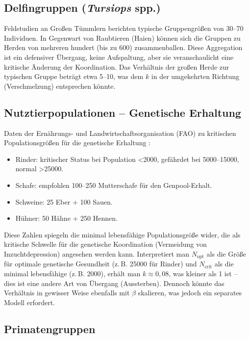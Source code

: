 \documentclass[12pt]{article}
\theoremstyle{remark}
\begin{document}
	\subsection{Delfingruppen (\textit{Tursiops} spp.)}
	\label{subsec:dolphins}
	
	Feldstudien an Großen Tümmlern \cite{Connor2000} berichten typische Gruppengrößen von 30–70 Individuen. In Gegenwart von Raubtieren (Haien) können sich die Gruppen zu Herden von mehreren hundert (bis zu 600) zusammenballen. Diese Aggregation ist ein defensiver Übergang, keine Aufspaltung, aber sie veranschaulicht eine kritische Änderung der Koordination. Das Verhältnis der großen Herde zur typischen Gruppe beträgt etwa 5–10, was dem $k$ in der umgekehrten Richtung (Verschmelzung) entsprechen könnte.
	
	\subsection{Nutztierpopulationen – Genetische Erhaltung}
	\label{subsec:livestock}
	
	Daten der Ernährungs- und Landwirtschaftsorganisation (FAO) zu kritischen Populationsgrößen für die genetische Erhaltung \cite{FAO2013}:
	\begin{itemize}
		\item Rinder: kritischer Status bei Population <2000, gefährdet bei 5000–15000, normal >25000.
		\item Schafe: empfohlen 100–250 Mutterschafe für den Genpool-Erhalt.
		\item Schweine: 25 Eber + 100 Sauen.
		\item Hühner: 50 Hähne + 250 Hennen.
	\end{itemize}
	Diese Zahlen spiegeln die minimal lebensfähige Populationsgröße wider, die als kritische Schwelle für die genetische Koordination (Vermeidung von Inzuchtdepression) angesehen werden kann. Interpretiert man $N_{\text{opt}}$ als die Größe für optimale genetische Gesundheit (z. B. 25000 für Rinder) und $N_{\text{crit}}$ als die minimal lebensfähige (z. B. 2000), erhält man $k \approx 0,08$, was kleiner als 1 ist – dies ist eine andere Art von Übergang (Aussterben). Dennoch könnte das Verhältnis in gewisser Weise ebenfalls mit $\beta$ skalieren, was jedoch ein separates Modell erfordert.
	
	\subsection{Primatengruppen}
	\label{subsec:primates}
	
\end{document}
